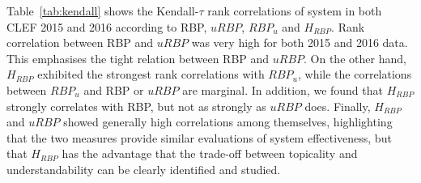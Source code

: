 
Table~\ref{tab:kendall} shows the Kendall-$\tau$ rank correlations of system in both CLEF 2015 and 2016 according to RBP, $uRBP$, $RBP_u$ and $H_{RBP}$. Rank correlation between RBP and $uRBP$ was very high for both 2015 and 2016 data. This emphasises the tight relation between RBP and $uRBP$. On the other hand, $H_{RBP}$ exhibited the strongest rank correlations with $RBP_u$, while the correlations between $RBP_u$ and RBP or $uRBP$ are marginal. In addition, we found that $H_{RBP}$ strongly correlates with RBP, but not as strongly as  $uRBP$ does. Finally, $H_{RBP}$ and $uRBP$ showed generally high correlations among themselves, highlighting that the two measures provide similar evaluations of system effectiveness, but that $H_{RBP}$ has the advantage that the trade-off between topicality and understandability can be clearly identified and studied. 


 
